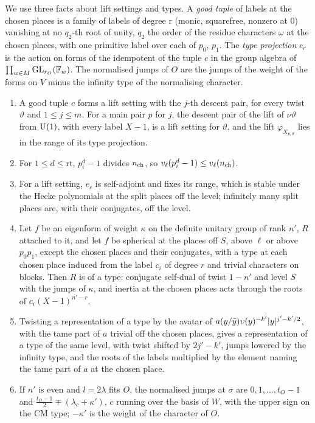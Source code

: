 We use three facts about lift settings and types. A \emph{good tuple} of labels at the chosen places is a family of labels of degree $\mathrm r$ (monic, squarefree, nonzero at $0$) vanishing at no $q_2$-th root of unity, $q_2$ the
order of the residue characters $\omega$ at the chosen places, with one primitive label over each of $p_0$, $p_1$. The \emph{type projection} $e_c$ is the action on forms of the idempotent of the tuple $c$ in the group algebra of
$\prod_{w\in M}\operatorname{GL}_{r_O}(\mathbb{F}_w)$. The normalised jumps of $O$ are the jumps of the weight of the forms on $V$ minus the infinity type of the normalising character.

\begin{lemma}\label{lem:lift-settings}
\begin{enumerate}[label=\textup{(\alph*)}]
\item A good tuple $c$ forms a lift setting with the $j$-th descent pair, for every twist $\vartheta$ and $1\le j\le m$. For a main pair $p$ for $j$, the descent pair of the lift of $\nu\vartheta$ from $\operatorname{U}(1)$, with every label $X-1$, is a
lift setting for $\vartheta$, and the lift $\varphi_{X_{p,\vartheta}}$ lies in the range of its type projection.
\item For $1\le d\le\mathrm r\mathrm t$, $p_i^d-1$ divides $n_{\rm ch}$, so $v_\ell(p_i^d-1)\le v_\ell(n_{\rm ch})$.
\item For a lift setting, $e_c$ is self-adjoint and fixes its range, which is stable under the Hecke polynomials at the split places off the level; infinitely many split places are, with their conjugates, off the level.
\item Let $f$ be an eigenform of weight $\kappa$ on the definite unitary group of rank $n'$, $R$ attached to it, and let $f$ be spherical at the places off $S$, above $\ell$ or above $p_0p_1$, except the chosen places and their
conjugates, with a type at each chosen place induced from the label $c_i$ of degree $r$ and trivial characters on blocks. Then $R$ is of a type: conjugate self-dual of twist $1-n'$ and level $S$ with the jumps of $\kappa$, and
inertia at the chosen places acts through the roots of $c_i(X-1)^{n'-r}$.
\item Twisting a representation of a type by the avatar of $a(y/\bar y)\upsilon(y)^{-k'}\lvert y\rvert^{j'-k'/2}$, with the tame part of $a$ trivial off the chosen places, gives a representation of a type of the same level, with twist
shifted by $2j'-k'$, jumps lowered by the infinity type, and the roots of the labels multiplied by the element naming the tame part of $a$ at the chosen place.
\item If $n'$ is even and $l=2\lambda$ fits $O$, the normalised jumps at $\sigma$ are $0,1,\dots,t_O-1$ and $\frac{t_O-1}2\mp(\lambda_c+\kappa')$, $c$ running over the basis of $W$, with the upper sign on the CM type; $-\kappa'$ is the weight of
the character of $O$.
\end{enumerate}
\end{lemma}

